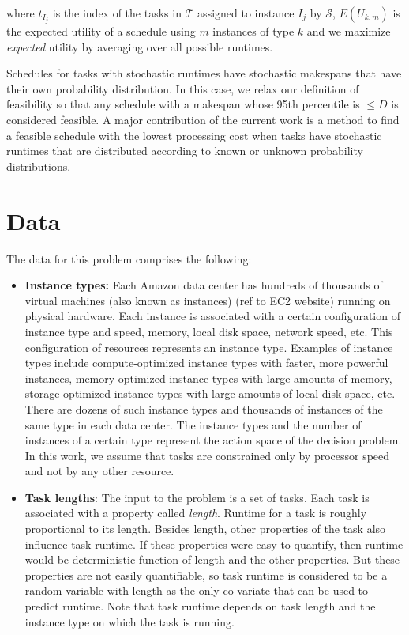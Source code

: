 \documentclass[12pt]{report}
\begin{document}
where $t_{I_j}$ is the index of the tasks in $\mathcal{T}$ assigned to instance $I_j$ by $\mathcal{S}$, $E(U_{k,m})$ is the expected utility of a schedule using $m$ instances of type $k$ and we maximize \textit{expected} utility by averaging over all possible runtimes.

Schedules for tasks with stochastic runtimes have stochastic makespans that have their own probability distribution. In this case, we relax our definition of feasibility so that any schedule with a makespan whose 95th percentile is $\le D$ is considered feasible. A major contribution of the current work is a method to find a feasible schedule with the lowest processing cost when tasks have stochastic runtimes that are distributed according to known or unknown probability distributions.

\section{Data}

\label{Data}
The data for this problem comprises the following:

\begin{itemize}
\item \textbf{Instance types:}
Each Amazon data center has hundreds of thousands of virtual machines  (also known as instances) (ref to EC2 website) running on physical hardware.
Each instance is associated with a certain configuration of instance type and speed, memory, local disk space, network speed, etc.
This configuration of resources represents an instance type.
Examples of instance types include compute-optimized instance types with faster, more powerful instances, memory-optimized instance types with large amounts of memory, storage-optimized instance types with large amounts of local disk space, etc.
There are dozens of such instance types and thousands of instances of the same type in each data center.
The instance types and the number of instances of a certain type represent the action space of the decision problem.
In this work, we assume that tasks are constrained only by processor speed and not by any other resource.

\item \textbf{Task lengths}:
The input to the problem is a set of tasks.
Each task is associated with a property called \textit{length}.
Runtime for a task is roughly proportional to its length.
Besides length, other properties of the task also influence task runtime.
If these properties were easy to quantify, then runtime would be deterministic function of length and the other properties.
But these properties are not easily quantifiable, so task runtime is considered to be a random variable with length as the only co-variate that can be used to predict runtime.
Note that task runtime depends on task length and the instance type on which the task is running.

\end{itemize}
\end{document}
